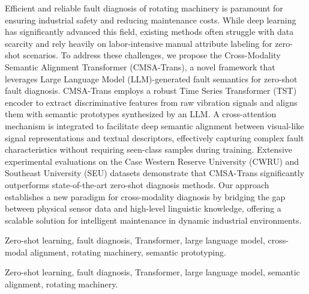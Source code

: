 Efficient and reliable fault diagnosis of rotating machinery is paramount for ensuring industrial safety and reducing maintenance costs. While deep learning has significantly advanced this field, existing methods often struggle with data scarcity and rely heavily on labor-intensive manual attribute labeling for zero-shot scenarios. To address these challenges, we propose the Cross-Modality Semantic Alignment Transformer (CMSA-Trans), a novel framework that leverages Large Language Model (LLM)-generated fault semantics for zero-shot fault diagnosis. CMSA-Trans employs a robust Time Series Transformer (TST) encoder to extract discriminative features from raw vibration signals and aligns them with semantic prototypes synthesized by an LLM. A cross-attention mechanism is integrated to facilitate deep semantic alignment between visual-like signal representations and textual descriptors, effectively capturing complex fault characteristics without requiring seen-class samples during training. Extensive experimental evaluations on the Case Western Reserve University (CWRU) and Southeast University (SEU) datasets demonstrate that CMSA-Trans significantly outperforms state-of-the-art zero-shot diagnosis methods. Our approach establishes a new paradigm for cross-modality diagnosis by bridging the gap between physical sensor data and high-level linguistic knowledge, offering a scalable solution for intelligent maintenance in dynamic industrial environments.

\begin{IEEEkeywords}
Zero-shot learning, fault diagnosis, Transformer, large language model, cross-modal alignment, rotating machinery, semantic prototyping.
\end{IEEEkeywords}

\begin{IEEEkeywords}
Zero-shot learning, fault diagnosis, Transformer, large language model, semantic alignment, rotating machinery.
\end{IEEEkeywords}
